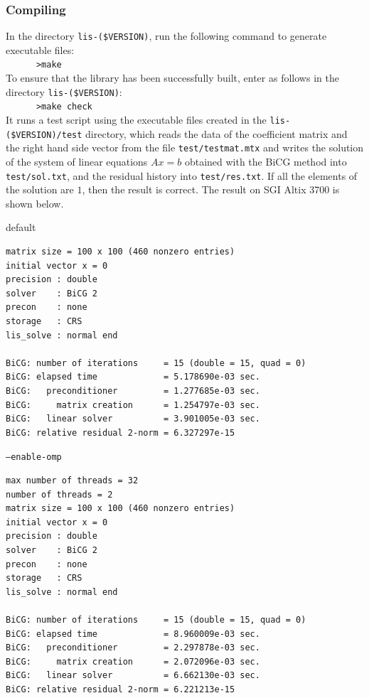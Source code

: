 \documentclass[a4paper]{article}
\begin{document}
 \subsubsection{Compiling}
 In the directory {\tt lis-(\$VERSION)}, run the following command to generate
 executable files: \\
 \verb+      >make +\\
To ensure that the library has been successfully built, enter 
as follows in the directory {\tt lis-(\$VERSION)}:\\
 \verb+      >make check+\\
It runs a test script using the executable files created 
in the {\tt lis-(\$VERSION)/test} directory, which reads 
the data of the coefficient matrix and the right hand side vector 
from the file 
{\tt test/testmat.mtx} and writes the solution 
of the system of linear equations $Ax = b$ obtained with the BiCG 
method into {\tt test/sol.txt}, and the residual history into 
{\tt test/res.txt}. If all the elements of the solution
are $1$, then the result is correct. The result on SGI Altix 3700 is
 shown below. 
\begin{itembox}[l]{default}
 \begin{minipage}{10cm}
 \begin{verbatim}
matrix size = 100 x 100 (460 nonzero entries)
initial vector x = 0
precision : double
solver    : BiCG 2
precon    : none
storage   : CRS
lis_solve : normal end

BiCG: number of iterations     = 15 (double = 15, quad = 0)
BiCG: elapsed time             = 5.178690e-03 sec.
BiCG:   preconditioner         = 1.277685e-03 sec. 
BiCG:     matrix creation      = 1.254797e-03 sec.
BiCG:   linear solver          = 3.901005e-03 sec.
BiCG: relative residual 2-norm = 6.327297e-15
 \end{verbatim}
 \end{minipage}
\end{itembox}
\begin{itembox}[l]{{\tt --enable-omp}}
 \begin{minipage}{10cm}
 \begin{verbatim}
max number of threads = 32
number of threads = 2
matrix size = 100 x 100 (460 nonzero entries)
initial vector x = 0
precision : double
solver    : BiCG 2
precon    : none
storage   : CRS
lis_solve : normal end

BiCG: number of iterations     = 15 (double = 15, quad = 0)
BiCG: elapsed time             = 8.960009e-03 sec.
BiCG:   preconditioner         = 2.297878e-03 sec. 
BiCG:     matrix creation      = 2.072096e-03 sec.
BiCG:   linear solver          = 6.662130e-03 sec.
BiCG: relative residual 2-norm = 6.221213e-15
 \end{verbatim}
 \end{minipage}
\end{itembox}
\end{document}
